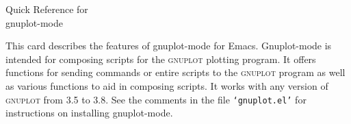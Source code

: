 \documentclass[twocolumn]{article}
\newenvironment{Boxedminipage}%
{\begin{Sbox}\begin{minipage}}%
  {\end{minipage}\end{Sbox}\Ovalbox{\TheSbox}}
\def\file#1{{\texttt{`#1'}}}
\begin{document}
\small

\thispagestyle{empty}

\begin{center}
  \begin{Boxedminipage}{0.75\linewidth}
    \begin{center}
      \vspace{0.01\textheight}
      {\Large Quick Reference for}\\
      \vspace{0.007\textheight}
      {\Large gnuplot-mode}
      \vspace{0.01\textheight}
    \end{center}
  \end{Boxedminipage}
\end{center}

\vspace{3ex}

This card describes the features of gnuplot-mode for Emacs.
Gnuplot-mode is intended for composing scripts for the
\textsc{gnuplot} plotting program.  It offers functions for sending
commands or entire scripts to the \textsc{gnuplot} program as well as
various functions to aid in composing scripts.  It works with any
version of \textsc{gnuplot} from 3.5 to 3.8.  See the comments in the
file \file{gnuplot.el} for instructions on installing gnuplot-mode.

\vspace{2ex}
\end{document}
